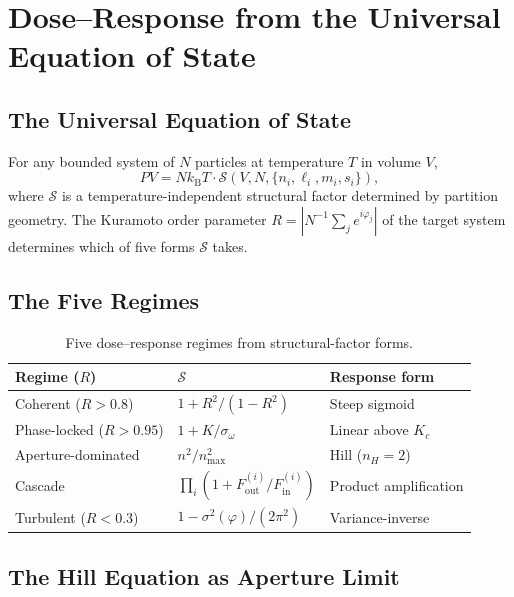 \documentclass[twocolumn,10pt,a4paper]{article}
\theoremstyle{definition}
\theoremstyle{remark}
\newcommand{\kB}{k_{\mathrm{B}}}
\begin{document}
\section{Dose--Response from the Universal Equation of State}

\subsection{The Universal Equation of State}

For any bounded system of $N$ particles at temperature $T$ in volume $V$,
\begin{equation}
    PV = N\kB T\cdot\mathcal{S}(V,N,\{n_i,\ell_i,m_i,s_i\}),
    \label{eq:eos}
\end{equation}
where $\mathcal{S}$ is a temperature-independent structural factor determined by partition geometry. The Kuramoto order parameter $R = |N^{-1}\sum_j e^{i\varphi_j}|$ of the target system determines which of five forms $\mathcal{S}$ takes.

\subsection{The Five Regimes}

\begin{table}[H]
\centering
\footnotesize
\caption{Five dose--response regimes from structural-factor forms.}
\label{tab:regimes}
\begin{tabular}{lll}
\toprule
Regime ($R$) & $\mathcal{S}$ & Response form \\
\midrule
Coherent ($R>0.8$) & $1 + R^2/(1-R^2)$ & Steep sigmoid \\
Phase-locked ($R>0.95$) & $1 + K/\sigma_\omega$ & Linear above $K_c$ \\
Aperture-dominated & $n^2/n_{\max}^2$ & Hill ($n_H=2$) \\
Cascade & $\prod_i(1+F_{\mathrm{out}}^{(i)}/F_{\mathrm{in}}^{(i)})$ & Product amplification \\
Turbulent ($R<0.3$) & $1-\sigma^2(\varphi)/(2\pi^2)$ & Variance-inverse \\
\bottomrule
\end{tabular}
\end{table}

\subsection{The Hill Equation as Aperture Limit}
\end{document}
